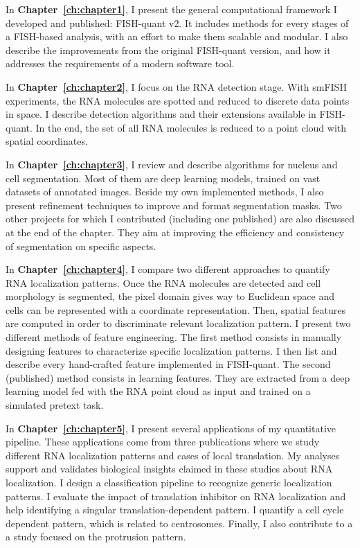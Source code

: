 In \textbf{Chapter~\ref{ch:chapter1}}, I present the general computational framework I developed and published: FISH-quant v2.
It includes methods for every stages of a \ac{FISH}-based analysis, with an effort to make them scalable and modular.
I also describe the improvements from the original FISH-quant version, and how it addresses the requirements of a modern software tool.

In \textbf{Chapter~\ref{ch:chapter2}}, I focus on the \ac{RNA} detection stage.
With \ac{smFISH} experiments, the \ac{RNA} molecules are spotted and reduced to discrete data points in space.
I describe detection algorithms and their extensions available in FISH-quant.
In the end, the set of all \ac{RNA} molecules is reduced to a point cloud with spatial coordinates.

In \textbf{Chapter~\ref{ch:chapter3}}, I review and describe algorithms for nucleus and cell segmentation.
Most of them are deep learning models, trained on vast datasets of annotated images.
Beside my own implemented methods, I also present refinement techniques to improve and format segmentation masks.
Two other projects for which I contributed (including one published) are also discussed at the end of the chapter.
They aim at improving the efficiency and consistency of segmentation on specific aspects.

In \textbf{Chapter~\ref{ch:chapter4}}, I compare two different approaches to quantify \ac{RNA} localization patterns.
Once the \ac{RNA} molecules are detected and cell morphology is segmented, the pixel domain gives way to Euclidean space and cells can be represented with a coordinate representation.
Then, spatial features are computed in order to discriminate relevant localization pattern.
I present two different methods of feature engineering.
The first method consists in manually designing features to characterize specific localization patterns.
I then list and describe every hand-crafted feature implemented in FISH-quant.
The second (published) method consists in learning features.
They are extracted from a deep learning model fed with the \ac{RNA} point cloud as input and trained on a simulated pretext task.

In \textbf{Chapter~\ref{ch:chapter5}}, I present several applications of my quantitative pipeline.
These applications come from three publications where we study different \ac{RNA} localization patterns and cases of local translation.
My analyses support and validates biological insights claimed in these studies about \ac{RNA} localization.
I design a classification pipeline to recognize generic localization patterns.
I evaluate the impact of translation inhibitor on \ac{RNA} localization and help identifying a singular translation-dependent pattern.
I quantify a cell cycle dependent pattern, which is related to centrosomes.
Finally, I also contribute to a a study focused on the protrusion pattern.

